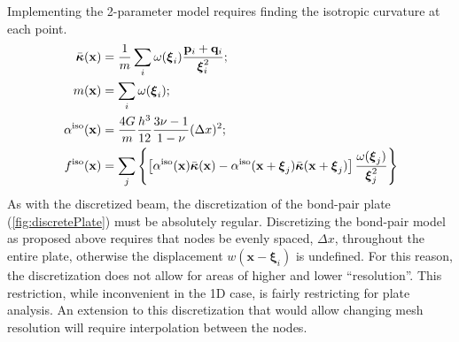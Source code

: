 Implementing the 2-parameter model requires finding the isotropic curvature at each point.
%
\begin{align*}
    \bar{\boldsymbol{\kappa}}(\mathbf{x}) &= \frac{1}{m} \sum_i \omega(\boldsymbol{\xi}_i)\frac{\mathbf{p}_i +\mathbf{q}_i }{\boldsymbol{\xi}_i^2};\notag \\
    m(\mathbf{x})  &= \sum_i \omega(\boldsymbol{\xi}_i); \notag \\
    \alpha^\text{iso}(\mathbf{x}) &= \frac{4G}{m}\frac{h^3}{12}\frac{3\nu-1}{1-\nu}(\Delta x)^2;\\
    f^\text{iso}(\mathbf{x}) &= \sum_j \left\{\left[\alpha^\text{iso}(\mathbf{x})\bar{\boldsymbol{\kappa}}(\mathbf{x})-\alpha^\text{iso}(\mathbf{x}+\boldsymbol{\xi}_j)\bar{\boldsymbol{\kappa}}(\mathbf{x}+\boldsymbol{\xi}_j) \right] \frac{\omega(\boldsymbol{\xi}_j)}{\boldsymbol{\xi}_j^2} \right\}
\end{align*}
%
As with the discretized beam, the discretization of the bond-pair plate (\cref{fig:discretePlate}) must be absolutely regular. 
Discretizing the bond-pair model as proposed above requires that nodes be evenly spaced, $\Delta x$, throughout the entire plate, otherwise the displacement \(w(\mathbf{x}-\boldsymbol{\xi}_i)\) is undefined.  For this reason, the discretization does not allow for areas of higher and lower ``resolution''.  This restriction, while inconvenient in the 1D case, is fairly restricting for plate analysis. An extension to this discretization that would allow changing mesh resolution will require interpolation between the nodes.  
%
%
%
%
%  
%
%
